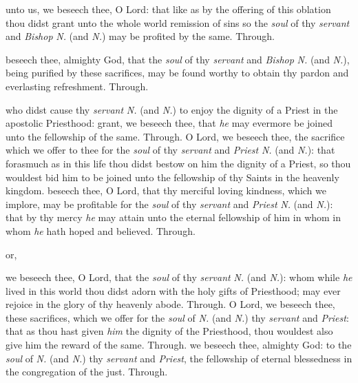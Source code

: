 \begin{multicols}{2}
\vspace{-3ex}

 unto us, we beseech thee, O Lord: that like as by the offering of this oblation thou didst grant unto the whole world remission of sins so the \textit{soul} of thy \textit{servant} and \textit{Bishop} \textit{N.} (and \textit{N.}) may be profited by the same. Through.

\vspace{-3ex}

 beseech thee, almighty God, that the \textit{soul} of thy \textit{servant} and \textit{Bishop} \textit{N.} (and \textit{N.}), being purified by these sacrifices, may be found worthy to obtain thy pardon and everlasting refreshment. Through.

 who didst cause thy \textit{servant} \textit{N.} (and \textit{N.}) to enjoy the dignity of a Priest in the apostolic Priesthood: grant, we beseech thee, that \textit{he} may evermore be joined unto the fellowship of the same. Through.
 O Lord, we beseech thee, the sacrifice which we offer to thee for the \textit{soul} of thy \textit{servant} and \textit{Priest} \textit{N.} (and \textit{N.}): that forasmuch as in this life thou didst bestow on him the dignity of a Priest, so thou wouldest bid him to be joined unto the fellowship of thy Saints in the heavenly kingdom.
 beseech thee, O Lord, that thy merciful loving kindness, which we implore, may be profitable for the \textit{soul} of thy \textit{servant} and \textit{Priest} \textit{N.} (and \textit{N.}): that by thy mercy \textit{he} may attain unto the eternal fellowship of him in whom in whom \textit{he} hath hoped and believed. Through.
\begin{inhead}
    or,
\end{inhead}
\vspace{-1\baselineskip}
 we beseech thee, O Lord, that the \textit{soul} of thy \textit{servant} \textit{N.} (and \textit{N.}): whom while \textit{he} lived in this world thou didst adorn with the holy gifts of Priesthood; may ever rejoice in the glory of thy heavenly abode. Through.
 O Lord, we beseech thee, these sacrifices, which we offer for the \textit{soul} of \textit{N.} (and \textit{N.}) thy \textit{servant} and \textit{Priest}: that as thou hast given \textit{him} the dignity of the Priesthood, thou wouldest also give him the reward of the same. Through.
 we beseech thee, almighty God: to the \textit{soul} of \textit{N.} (and \textit{N.}) thy \textit{servant} and \textit{Priest}, the fellowship of eternal blessedness in the congregation of the just. Through.


\end{multicols}

